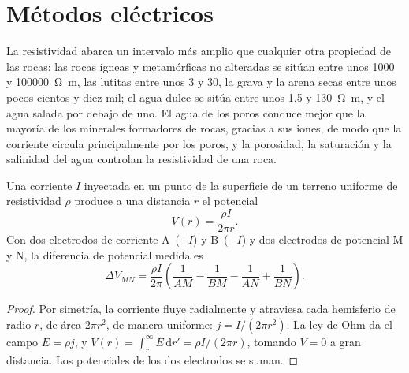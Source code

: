 \section{Métodos eléctricos}\label{sec:b3:field-lab-methods-3:electrical}

La resistividad abarca un intervalo más amplio que cualquier otra propiedad de las rocas:
las rocas ígneas y metamórficas no alteradas se sitúan entre unos
\num{1000} y \qty{100000}{\ohm\metre}, las lutitas entre unos
\num{3} y \num{30}, la grava y la arena secas entre unos pocos cientos y diez
mil; el agua dulce se sitúa entre unos \num{1.5} y
\qty{130}{\ohm\metre}, y el agua salada por debajo de uno. El agua de los poros conduce
mejor que la mayoría de los minerales formadores de rocas, gracias a sus iones, de modo que la corriente
circula principalmente por los poros, y la porosidad, la saturación y
la salinidad del agua controlan la resistividad de una roca.

\begin{theorem}\label{thm:b3:field-lab-methods-3:point-source}
Una corriente $I$ inyectada en un punto de la superficie de un terreno uniforme de
resistividad $\rho$ produce a una distancia $r$ el potencial
\[
V(r) = \frac{\rho I}{2\pi r} .
\]
Con dos electrodos de corriente A~($+I$) y B~($-I$) y dos electrodos de potencial
M y N, la diferencia de potencial medida es
\[
\Delta V_{MN} = \frac{\rho I}{2\pi}\left(\frac{1}{AM} - \frac{1}{BM}
               - \frac{1}{AN} + \frac{1}{BN}\right) .
\]
\end{theorem}

\begin{proof}
Por simetría, la corriente fluye radialmente y atraviesa cada hemisferio de
radio $r$, de área $2\pi r^2$, de manera uniforme: $j = I/(2\pi r^2)$. La ley de Ohm
da el campo $E = \rho j$, y $V(r) = \int_r^\infty E\,\mathrm{d}r'
= \rho I/(2\pi r)$, tomando $V = 0$ a gran distancia. Los potenciales de los dos
electrodos se suman.
\end{proof}

